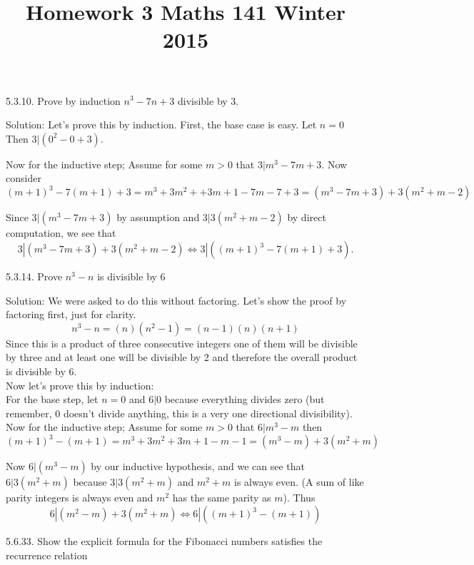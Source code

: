 \documentclass[16 pt]{amsart}
\theoremstyle{definition}
\theoremstyle{remark}
\numberwithin{equation}{section}
\begin{document}
\title{Homework 3 Maths 141 Winter 2015}
\maketitle 


5.3.10. Prove by induction $n^3 - 7n + 3$ divisible by $3$.

\vspace{1in}

Solution: Let's prove this by induction.  First, the base case is easy.  Let $n=0$ 
Then $3 | (0^2- 0 +3)$.

Now for the inductive step;  Assume for some $m>0$ that $3|m^3 - 7m + 3$.
Now consider
\[
(m+1)^3 - 7(m+1) + 3 = m^3 + 3m^2 + +3m + 1 -7m - 7 + 3 = (m^3-7m + 3) + 3(m^2+m - 2)
\]

Since $3|(m^3-7m+3)$ by assumption and $3| 3(m^2+m-2)$ by direct computation, we see that 
\[
3|(m^3-7m+3)+3(m^2+m-2) \iff 3 | ((m+1)^3-7(m+1)+3).
\]

\newpage

5.3.14. Prove $n^3-n$ is divisible by $6$

\vspace{1in}


Solution: We were asked to do this without factoring.  Let's show the proof by factoring first, just for clarity.
\[
n^3-n = (n)(n^2-1) = (n-1)(n)(n+1)
\]
Since this is a product of three consecutive integers one of them will be divisible by three and at least one will be divisible by 2 and therefore the overall product is divisible by 6.\\

Now let's prove this by induction:\\
For the base step, let $n=0$ and $6|0$ because everything divides zero (but remember, 0 doesn't divide anything, this is a very one directional divisibility).\\

Now for the inductive step; Assume for some $m>0$ that $6|m^3-m$ then
\[
(m+1)^3 - (m+1) = m^3 + 3m^2+3m + 1 - m - 1 = (m^3-m) + 3(m^2+m)
\]

Now $6|(m^3-m)$ by our inductive hypothesis, and we can see that $6|3(m^2+m)$ 
because $3|3(m^2+m)$ and $m^2+m$ is always even.  (A sum of like parity integers is always even and $m^2$ has the same parity as $m$).
Thus 
\[
6|(m^2-m) + 3(m^2+m) \iff 6|((m+1)^3-(m+1))
\]

\newpage



5.6.33. Show the explicit formula for the Fibonacci numbers satisfies the recurrence relation
\end{document}
